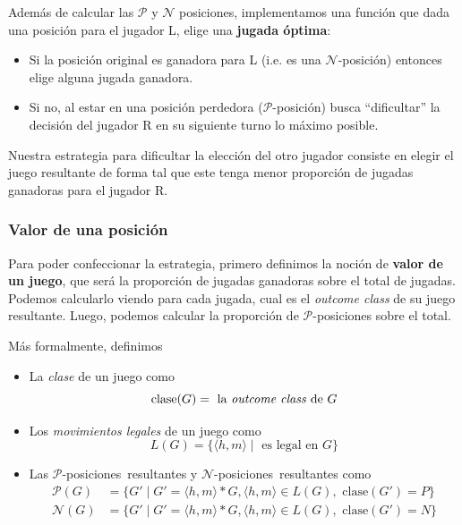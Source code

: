 \documentclass{article}
\newcommand{\calP}{$\mathcal{P}$}
\newcommand{\pPosition}{\calP{}-posición}
\newcommand{\pPositions}{\calP{}-posiciones}
\newcommand{\calN}{$\mathcal{N}$}
\newcommand{\nPosition}{\calN{}-posición}
\newcommand{\nPositions}{\calN{}-posiciones}
\newcommand{\nimTuple}[2]{\langle #1, #2\rangle}
\begin{document}
Además de calcular las \calP{} y \calN{} posiciones, implementamos una función que dada una posición para el jugador L, elige una \textbf{jugada óptima}:

\begin{itemize}
    \item Si la posición original es ganadora para L (i.e. es una \nPosition) entonces elige alguna jugada ganadora.
    \item Si no, al estar en una posición perdedora (\pPosition) busca ``dificultar'' la decisión del jugador R en su siguiente turno lo máximo posible.
\end{itemize}

Nuestra estrategia para dificultar la elección del otro jugador consiste en elegir el juego resultante de forma tal que este tenga menor proporción de jugadas ganadoras para el jugador R.

\subsubsection*{Valor de una posición}

Para poder confeccionar la estrategia, primero definimos la noción de \textbf{valor de un juego}, que será la proporción de jugadas ganadoras sobre el total de jugadas. Podemos calcularlo viendo para cada jugada, cual es el \textit{outcome class} de su juego resultante. Luego, podemos calcular la proporción de \pPositions{} sobre el total.

Más formalmente, definimos 

\begin{itemize}
    \item La \textit{clase} de un juego como
    \[
        \text{clase}(G) = \text{ la \textit{outcome class} de } G
    \]
    \item Los \textit{movimientos legales} de un juego como
    \[L(G) = \{ \nimTuple{h}{m} \mid \text{ es legal en } G \}\]
    \item Las \pPositions\ resultantes y \nPositions\ resultantes como
    \begin{align*}
        \text{\calP}(G) &= \{ G' \mid G' = \nimTuple{h}{m} \ast G, \nimTuple{h}{m} \in L(G), \text{ clase}(G') = P \}\\
        \text{\calN}(G) &= \{ G' \mid G' = \nimTuple{h}{m} \ast G, \nimTuple{h}{m} \in L(G), \text{ clase}(G') = N \}
    \end{align*}
\end{itemize}
\end{document}
